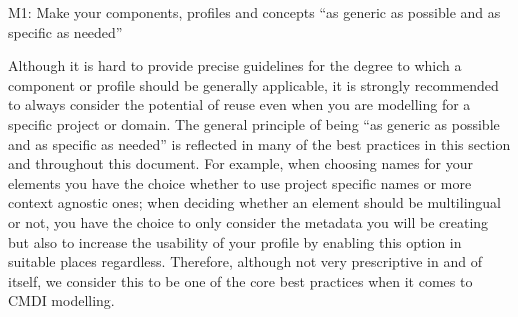 M1: Make your components, profiles and concepts ``as generic as possible
and as specific as needed''


Although it is hard to provide precise guidelines for the degree to
which a component or profile should be generally applicable, it is
strongly recommended to always consider the potential of reuse even when
you are modelling for a specific project or domain. The general
principle of being ``as generic as possible and as specific as needed''
is reflected in many of the best practices in this section and
throughout this document. For example, when choosing names for your
elements you have the choice whether to use project specific names or
more context agnostic ones; when deciding whether an element should be
multilingual or not, you have the choice to only consider the metadata
you will be creating but also to increase the usability of your profile
by enabling this option in suitable places regardless. Therefore,
although not very prescriptive in and of itself, we consider this to be
one of the core best practices when it comes to CMDI modelling.
